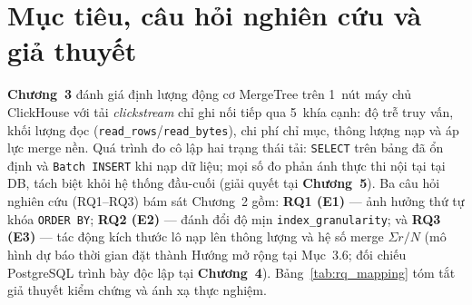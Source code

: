 \documentclass[13pt,a4paper]{report}
\begin{document}
\section{Mục tiêu, câu hỏi nghiên cứu và giả thuyết}
\textbf{Chương~3} đánh giá định lượng động cơ MergeTree trên 1~nút máy chủ ClickHouse với tải \textit{clickstream} chỉ ghi nối tiếp qua 5~khía cạnh: độ trễ truy vấn, khối lượng đọc (\texttt{read\_\allowbreak{}rows}/\texttt{read\_\allowbreak{}bytes}), chi phí chỉ mục, thông lượng nạp và áp lực merge nền. Quá trình đo cô lập hai trạng thái tải: \texttt{SELECT} trên bảng đã ổn định và \texttt{Batch INSERT} khi nạp dữ liệu; mọi số đo phản ánh thực thi nội tại tại DB, tách biệt khỏi hệ thống đầu-cuối (giải quyết tại \textbf{Chương~5}). Ba câu hỏi nghiên cứu (RQ1--RQ3) bám sát Chương~2 gồm: \textbf{RQ1 (E1)} --- ảnh hưởng thứ tự khóa \texttt{ORDER BY}; \textbf{RQ2 (E2)} --- đánh đổi độ mịn \texttt{index\_\allowbreak{}granularity}; và \textbf{RQ3 (E3)} --- tác động kích thước lô nạp lên thông lượng và hệ số merge $\Sigma r / N$ (mô hình dự báo thời gian đặt thành Hướng mở rộng tại Mục~3.6; đối chiếu PostgreSQL trình bày độc lập tại \textbf{Chương~4}). Bảng~\ref{tab:rq_mapping} tóm tắt giả thuyết kiểm chứng và ánh xạ thực nghiệm.
\end{document}
